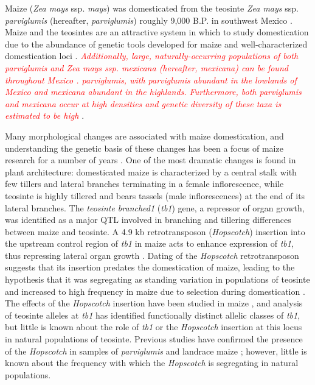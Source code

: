 \documentclass[11pt]{article} %
\newcommand{\track}[1]{\textcolor{red}{\emph{\normalsize #1}} }
\begin{document}
\begin{linenumbers}
\begin{flushleft}
Maize (\emph{Zea mays} ssp. \emph{mays}) was domesticated from the teosinte \emph{Zea mays} ssp. \emph{parviglumis} (hereafter, \emph{parviglumis}) roughly 9,000 B.P. in southwest Mexico \citep{Piperno2009, Matsuoka2002}. Maize and the teosintes are an attractive system in which to study domestication due to the abundance of genetic tools developed for maize and well-characterized domestication loci \citep{Hufford2012a, Doebley2004, Hufford2012b}. 
\track{Additionally, large, naturally-occurring populations of both \emph{parviglumis} and \emph{Zea mays} ssp. \emph{mexicana} (hereafter, \emph{mexicana}) can be found throughout Mexico \citep{Wilkes1977, Hufford2013}. \emph{parviglumis}, with \emph{parviglumis} abundant in the lowlands of Mexico and \emph{mexicana} abundant in the highlands. Furthermore, both \emph{parviglumis} and \emph{mexicana} occur at high densities and genetic diversity of these taxa is estimated to be high \citep{Hufford2012a, Ross-Ibarra2009}}. 

Many morphological changes are associated with maize domestication, and understanding the genetic basis of these changes has been a focus of maize research for a number of years \citep{Doebley2004}. One of the most dramatic changes is found in plant architecture: domesticated maize is characterized by a central stalk with few tillers and lateral branches terminating in a female inflorescence, while teosinte is highly tillered and bears tassels (male inflorescences) at the end of its lateral branches. The \emph{teosinte branched1} (\emph{tb1}) gene, a repressor of organ growth, was identified as a major QTL involved in  branching \citep{DoebleyStecGustus1995} and tillering \citep{DoebleyStec1991} differences between maize and teosinte.  A 4.9 kb retrotransposon (\emph{Hopscotch}) insertion into the upstream control region of \emph{tb1} in maize acts to enhance expression of \emph{tb1}, thus repressing lateral organ growth \citep{Doebley1997, Studer2011}.  Dating of the \emph{Hopscotch} retrotransposon suggests that its insertion predates the domestication of maize, leading to the hypothesis that it was segregating as standing variation in populations of teosinte and increased to high frequency in maize due to selection during domestication \citep{Studer2011}. The effects of the \emph{Hopscotch} insertion have been studied in maize \citep{Studer2011}, and analysis of teosinte alleles at \emph{tb1} has identified functionally distinct allelic classes of \emph{tb1}\citep{StuderDoebley2012}, but little is known about the role of \emph{tb1} or the \emph{Hopscotch} insertion at this locus in natural populations of teosinte. Previous studies have confirmed the presence of the \emph{Hopscotch} in samples of \emph{parviglumis} and landrace maize \citep{Studer2011}; however, little is known about the frequency with which the \emph{Hopscotch} is segregating in natural populations.


\end{flushleft}
\end{linenumbers}
\end{document}
